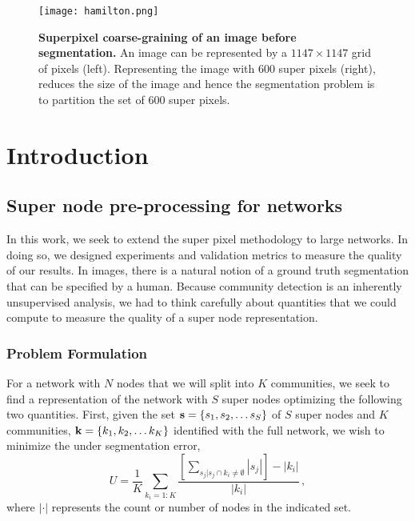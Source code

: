 \begin{figure}
\begin{center}
\texttt{[image: hamilton.png]}
\caption{{\bf Superpixel coarse-graining of an image before segmentation.} An image can be represented by a $1147 \times 1147$ grid of pixels (left). Representing the image with 600 super pixels (right), reduces the size of the image and hence the segmentation problem is to partition the set of 600 super pixels. }
\label{fig:superPix}
\end{center}
\end{figure}

\section{Introduction}

\subsection{Super node pre-processing for networks}
In this work, we seek to extend the super pixel methodology to large networks. In doing so, we designed experiments and validation metrics to measure the quality of our results. In images, there is a natural notion of a ground truth segmentation that can be specified by a human. Because community detection is an inherently unsupervised analysis, we had to think carefully about quantities that we could compute to measure the quality of a super node representation.

\subsubsection{Problem Formulation}
For a network with $N$ nodes that we will split into $K$ communities, we seek to find a representation of the network with $S$ super nodes optimizing the following two quantities. First, given the set ${\bf s}=\{s_{1},s_{2},\dots s_{S}\}$ of $S$ super nodes and $K$ communities, ${\bf k}=\{k_{1},k_{2}, \dots k_{K}\}$ identified with the full network, we wish to minimize the under segmentation error, 
\begin{equation}
\label{UnderSeg}
U=\frac{1}{K}\sum_{k_{i}=1:K}\frac{[\sum_{s_{j}|s_{j}\cap k_{i}\ne \emptyset}|s_{j}|]-|k_{i}|}{|k_{i}|}\,,
\end{equation}
where $|\cdot|$ represents the count or number of nodes in the indicated set.

